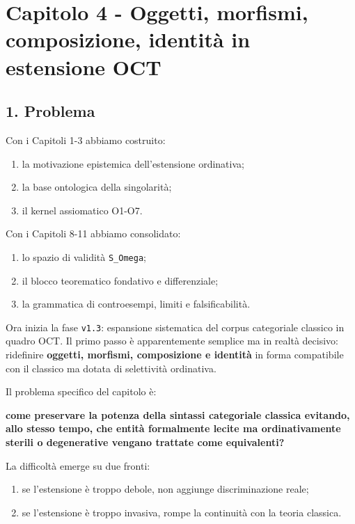 \chapter{Capitolo 4 - Oggetti, morfismi, composizione, identità in estensione OCT}

\section{1. Problema}

Con i Capitoli 1-3 abbiamo costruito:

\begin{enumerate}
\def\labelenumi{\arabic{enumi}.}
\tightlist
\item
  la motivazione epistemica dell'estensione ordinativa;
\item
  la base ontologica della singolarità;
\item
  il kernel assiomatico O1-O7.
\end{enumerate}

Con i Capitoli 8-11 abbiamo consolidato:

\begin{enumerate}
\def\labelenumi{\arabic{enumi}.}
\tightlist
\item
  lo spazio di validità \texttt{S\_Omega};
\item
  il blocco teorematico fondativo e differenziale;
\item
  la grammatica di controesempi, limiti e falsificabilità.
\end{enumerate}

Ora inizia la fase \texttt{v1.3}: espansione sistematica del corpus categoriale classico in quadro OCT. Il primo passo è apparentemente semplice ma in realtà decisivo: ridefinire \textbf{oggetti, morfismi, composizione e identità} in forma compatibile con il classico ma dotata di selettività ordinativa.

Il problema specifico del capitolo è:

\textbf{come preservare la potenza della sintassi categoriale classica evitando, allo stesso tempo, che entità formalmente lecite ma ordinativamente sterili o degenerative vengano trattate come equivalenti?}

La difficoltà emerge su due fronti:

\begin{enumerate}
\def\labelenumi{\arabic{enumi}.}
\tightlist
\item
  se l'estensione è troppo debole, non aggiunge discriminazione reale;
\item
  se l'estensione è troppo invasiva, rompe la continuità con la teoria classica.
\end{enumerate}

